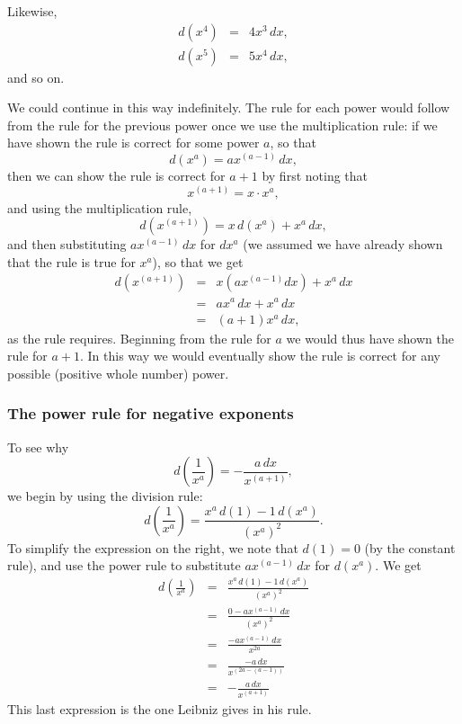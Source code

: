 \documentclass[polutonikogreek,english,twoside,openright]{article}
\newlength{\oldjot}
\begin{document}
Likewise, 
\begin{eqnarray*}
d(x^4) & = & 4x^3\,dx,\\
d(x^5) & = & 5x^4\,dx,
\end{eqnarray*}
and so on.

We could continue in this way indefinitely.  The rule for each power
would follow from the rule for the previous power once we use the
multiplication rule: if we have shown the rule is correct for some
power $a$, so that
$$d(x^a) = ax^{(a-1)}\,dx,$$
then we can show the rule is correct for $a+1$ by first noting that 
$$x^{(a+1)} = x \cdot x^a,$$ 
and using the multiplication rule,
$$d(x^{(a+1)}) = x\,d(x^a) + x^a\,dx,$$
and then substituting $ax^{(a-1)}\,dx$ for $dx^a$ (we assumed we have
already shown that the rule is true for $x^a$), so that we get
\begin{eqnarray*}
d(x^{(a+1)}) & = & x(ax^{(a-1)}dx) + x^a\,dx \\
& = & ax^a\,dx + x^a\,dx \\
& = & (a+1)x^a\,dx,
\end{eqnarray*}
as the rule requires.  Beginning from the rule for $a$ we would thus
have shown the rule for $a+1$.  In this way we would eventually show
the rule is correct for any possible (positive whole number) power.

\subsubsection*{The power rule for negative exponents}

To see why 
$$d\left(\frac{1}{x^a}\right) = - \frac{a\,dx}{x^{(a+1)}},$$
we begin by using the division rule:
$$d\left(\frac{1}{x^a}\right) = \frac{x^a\,d(1) - 1\,d(x^a)}{(x^a)^2}.$$
To simplify the expression on the right, we note that $d(1) = 0$ (by
the constant rule), and use the power rule to substitute
$ax^{(a-1)}\,dx$ for $d(x^a)$.  We get \setlength{\jot}{1.5ex}
\begin{eqnarray*}
d\left(\frac{1}{x^a}\right) & = & \frac{x^a\,d(1) - 1\,d(x^a)}{(x^a)^2}\\
& = & \frac{0 -ax^{(a-1)}\,dx}{(x^a)^2} \\
& = & \frac{-ax^{(a-1)}\,dx}{x^{2a}}\\
& = & \frac{-a\,dx}{x^{(2a-(a-1))}}\\
& = & -\frac{a\,dx}{x^{(a+1)}}
\end{eqnarray*}
\setlength{\jot}{\oldjot}
This last expression is the one Leibniz gives in his rule.
\end{document}
